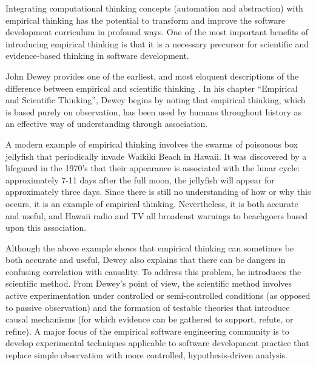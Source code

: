 Integrating computational thinking concepts (automation and abstraction)
with empirical thinking has the potential to transform and improve the
software development curriculum in profound ways. One of the most important
benefits of introducing empirical thinking is that it is a necessary
precursor for scientific and evidence-based thinking in software
development.

John Dewey provides one of the earliest, and most eloquent descriptions of
the difference between empirical and scientific thinking \citep{Dewey10}.
In his chapter ``Empirical and Scientific Thinking'', Dewey begins by
noting that empirical thinking, which is based purely on observation, has
been used by humans throughout history as an effective way of understanding
through association.

A modern example of empirical thinking involves the swarms of poisonous box
jellyfish that periodically invade Waikiki Beach in Hawaii.  It was
discovered by a lifeguard in the 1970's that their appearance is associated
with the lunar cycle: approximately 7-11 days after the full moon, the
jellyfish will appear for approximately three days.  Since there is still no
understanding of how or why this occurs, it is an example of empirical
thinking.  Nevertheless, it is both accurate and useful, and Hawaii radio
and TV all broadcast warnings to beachgoers based upon this association.

Although the above example shows that empirical thinking can sometimes be
both accurate and useful, Dewey also explains that there can be dangers in
confusing correlation with causality. To address this problem, he
introduces the scientific method.  From Dewey's point of view, the
scientific method involves active experimentation under controlled or
semi-controlled conditions (as opposed to passive observation) and the
formation of testable theories that introduce causal mechanisms (for which
evidence can be gathered to support, refute, or refine).  A major focus of
the empirical software engineering community is to develop experimental
techniques applicable to software development practice that replace simple
observation with more controlled, hypothesis-driven analysis.


